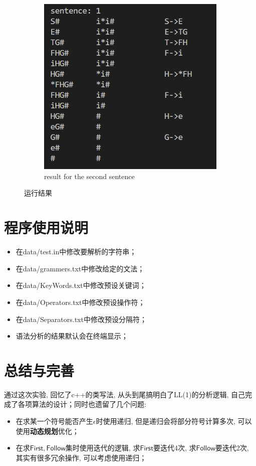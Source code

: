 \documentclass{zpt}
\begin{document}
\begin{figure}[H]
\begin{subfigure}[b]{0.4\textwidth}
            \includegraphics[width=\textwidth]{../resources/sentence1.png}
            \caption{result for the second sentence}
            \label{fig::sentence1}
        \end{subfigure}
        \caption{运行结果}
    \end{figure}
    \section{程序使用说明}
    \begin{itemize}
        \item 在data/test.in中修改要解析的字符串；
        \item 在data/grammers.txt中修改给定的文法；
        \item 在data/KeyWords.txt中修改预设关键词；
        \item 在data/Operators.txt中修改预设操作符；
        \item 在data/Separators.txt中修改预设分隔符；
        \item 语法分析的结果默认会在终端显示；
    \end{itemize}
    \section{总结与完善}
    通过这次实验, 回忆了c++的类写法, 从头到尾搞明白了LL(1)的分析逻辑, 自己完成了各项算法的设计；同时也遗留了几个问题:
    \begin{itemize}
        \item 在求某一个符号能否产生$\epsilon$时使用递归, 但是递归会将部分符号计算多次, 可以使用\textbf{动态规划}优化；
        \item 在求$\mathsf{First},\mathsf{Follow}$集时使用迭代的逻辑, 求$\mathsf{First}$要迭代4次, 求$\mathsf{Follow}$要迭代2次, 其实有很多冗余操作, 可以考虑使用递归；
    \end{itemize}
\end{document}
